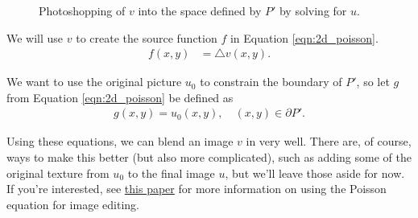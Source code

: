 \begin{figure}[H]
\begin{center}
\end{center}
  \caption{Photoshopping of $v$ into the space defined by $P'$ by solving for $u$.}
  \label{figure:photoshop_eqn}
\end{figure}

We will use $v$ to create the source function $f$ in Equation \eqref{eqn:2d_poisson}.
\begin{align}
f(x,y) &= \triangle v(x,y).
\label{eqn:photoshop_step1}
\end{align}

We want to use the original picture $u_0$ to constrain the boundary of $P'$, so let $g$ from Equation \eqref{eqn:2d_poisson} be defined as
\begin{align}
g(x,y) = u_0(x,y), \quad (x,y)\in \partial P'.
\end{align}

Using these equations, we can blend an image $v$ in very well.
There are, of course, ways to make this better (but also more complicated), such as adding some of the original texture from $u_0$ to the final image $u$, but we'll leave those aside for now.
If you're interested, see \href{https://www.cs.jhu.edu/~misha/Fall07/Papers/Perez03.pdf}{this paper} for more information on using the Poisson equation for image editing.

